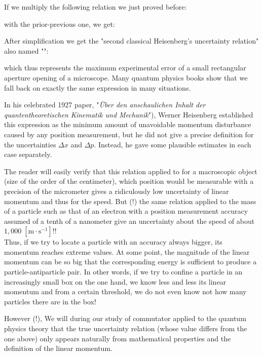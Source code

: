 	If we multiply the following relation we just proved before:
	
	with the prior-previous one, we get:
	
	After simplification we get the "second classical Heisenberg's uncertainty relation" also named "":
	
	which thus represents the maximum experimental error of a small rectangular aperture opening of a microscope. Many quantum physics books show that we fall back on exactly the same expression in many situations.
	
	In his celebrated 1927 paper, "\textit{Über den anschaulichen Inhalt der quantentheoretischen Kinematik und Mechanik}"), Werner Heisenberg established this expression as the minimum amount of unavoidable momentum disturbance caused by any position measurement, but he did not give a precise definition for the uncertainties $\Delta x$ and $\Delta p$. Instead, he gave some plausible estimates in each case separately.
	\begin{tcolorbox}[title=Remark,colframe=black,arc=10pt]
	The reader will easily verify that this relation applied to for a macroscopic object (size of the order of the centimeter), which position would be measurable with a precision of the micrometer gives a ridiculously low uncertainty of linear momentum and thus for the speed. But (!) the same relation applied to the mass of a particle such as that of an electron with a position measurement accuracy assumed of a tenth of a nanometer give an uncertainty about the speed of about $1,000\;[\text{m}\cdot\text{s}^{-1}]$!!\\

	Thus, if we try to locate a particle with an accuracy always bigger, its momentum reaches extreme values. At some point, the magnitude of the linear momentum can be so big that the corresponding energy is sufficient to produce a particle-antiparticle pair. In other words, if we try to confine a particle in an increasingly small box on the one hand, we know less and less its linear momentum and from a certain threshold, we do not even know not how many particles there are in the box!
	\end{tcolorbox}
	However (!), We will during our study of commutator applied to the quantum physics theory that the true uncertainty relation (whose value differs from the one above) only appears naturally from mathematical properties and the definition of the linear momentum.

